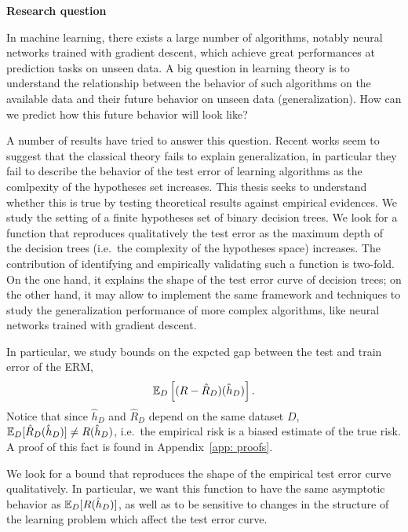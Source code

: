 \documentclass[reqno]{amsart}
\begin{document}
{\bf Research question}

In machine learning, there exists a large number of algorithms, notably neural networks trained with gradient descent, which achieve great performances at prediction tasks on unseen data. A big question in learning theory is to understand the relationship between the behavior of such algorithms on the available data and their future behavior on unseen data (generalization). How can we predict how this future behavior will look like? 

A number of results have tried to answer this question. Recent works seem to suggest that the classical theory fails to explain generalization, in particular they fail to describe the behavior of the test error of learning algorithms as the comlpexity of the hypotheses set increases. This thesis seeks to understand whether this is true by testing theoretical results against empirical evidences. We study the setting of a finite hypotheses set of binary decision trees. We look for a function that reproduces qualitatively the test error as the maximum depth of the decision trees (i.e.\ the complexity of the hypotheses space) increases. The contribution of identifying and empirically validating such a function is two-fold. On the one hand, it explains the shape of the test error curve of decision trees; on the other hand, it may allow to implement the same framework and techniques to study the generalization performance of more complex algorithms, like neural networks trained with gradient descent. 

In particular, we study bounds on the expcted gap between the test and train error of the ERM, \[\mathbb{E}_D\left[(R - \hat R_D)(\hat h_D)\right].\] 
Notice that since $\hat h_D$ and $\hat R_D$ depend on the same dataset $D$, $\mathbb{E}_D[\hat R_D(\hat h_D)]\neq R(\hat h_D)$, i.e.\ the empirical risk is a biased estimate of the true risk. A proof of this fact is found in Appendix~\ref{app: proofs}.

We look for a bound that reproduces the shape of the empirical test error curve qualitatively. 
In particular, we want this function to have the same asymptotic behavior as $\mathbb{E}_D[R(\hat h_D)]$,
as well as to be sensitive to changes in the structure of the learning problem which affect the test error curve. %
\end{document}
